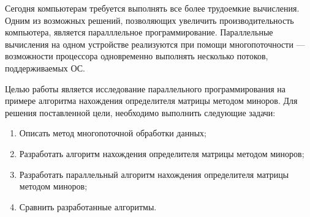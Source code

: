 \hspace{\parindent}
Сегодня компьютерам требуется выполнять все более трудоемкие вычисления. Одним из возможных решений, позволяющих увеличить производительность компьютера, является паралллельное программирование. Параллельные вычисления на одном устройстве реализуются при помощи многопоточности --- возможности процессора одновременно выполнять несколько потоков, поддерживаемых ОС.

Целью работы является исследование параллельного программирования на примере алгоритма нахождения определителя матрицы методом миноров. 
Для решения поставленной цели, необходимо выполнить следующие задачи:
\begin{enumerate}
	\item Описать метод многопоточной обработки данных;
	\item Разработать алгоритм нахождения определителя матрицы методом миноров;
	\item Разработать параллельный алгоритм нахождения определителя матрицы методом миноров;
	\item Сравнить разработанные алгоритмы.
\end{enumerate}